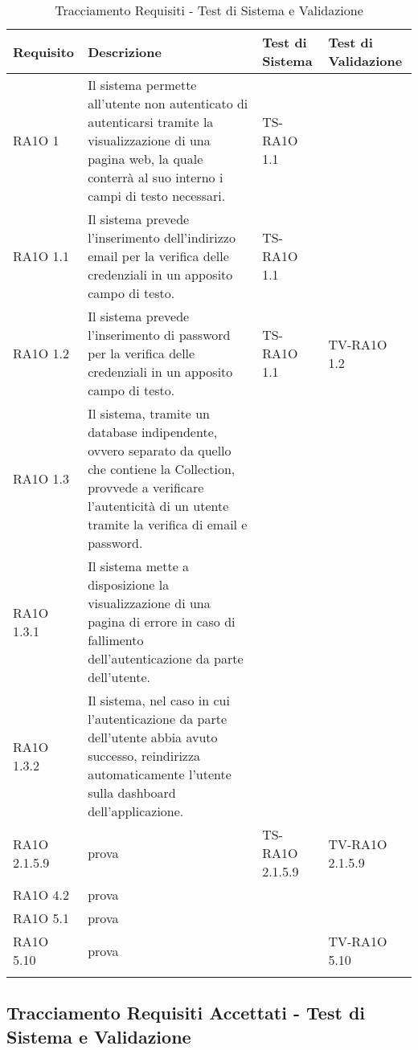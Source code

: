 	\begin{center}
	\def\arraystretch{1.5}
	\bgroup
		\begin{longtable}{| p{2cm} | p{6cm} | p{2.5cm} | p{2.5cm} | }
		\hline 
		 \textbf{Requisito} & \textbf{Descrizione} & \textbf{Test di Sistema} & \textbf{Test di Validazione} \\ \hline
				RA1O 1 & 
				Il sistema permette all'utente non autenticato di autenticarsi tramite la visualizzazione di una pagina web, la quale conterrà al suo interno i campi di testo necessari.  & TS-RA1O 1.1 & \\ \hline 
				RA1O 1.1 & 
				Il sistema prevede l'inserimento dell'indirizzo email per la verifica delle credenziali in un apposito campo di testo. & TS-RA1O 1.1 & \\ \hline 
				RA1O 1.2 & 
				Il sistema prevede l'inserimento di password per la verifica delle credenziali in un apposito campo di testo. & TS-RA1O 1.1 &TV-RA1O 1.2 \\ \hline 
				RA1O 1.3 & 
				Il sistema, tramite un database indipendente, ovvero separato da quello che contiene la Collection, provvede a verificare l'autenticità  di un utente tramite la verifica di email e password. &  &  \\ \hline 
				RA1O 1.3.1 & 
				Il sistema mette a disposizione la visualizzazione di una pagina di errore in caso di fallimento dell'autenticazione da parte dell'utente. &  &  \\ \hline 
				RA1O 1.3.2 & 
				Il sistema, nel caso in cui l'autenticazione da parte dell'utente abbia avuto successo, reindirizza automaticamente l'utente sulla dashboard dell'applicazione. &  &  \\ \hline 
				RA1O 2.1.5.9 & 
				prova & TS-RA1O 2.1.5.9 &TV-RA1O 2.1.5.9 \\ \hline 
				RA1O 4.2 & 
				prova &  &  \\ \hline 
				RA1O 5.1 & 
				prova &  &  \\ \hline 
				RA1O 5.10 & 
				prova &  & TV-RA1O 5.10 \\ \hline 
		\caption{Tracciamento Requisiti - Test di Sistema e Validazione}
		\end{longtable}
	 \egroup
\end{center}
\clearpage

\subsection{Tracciamento Requisiti Accettati - Test di Sistema e Validazione}

